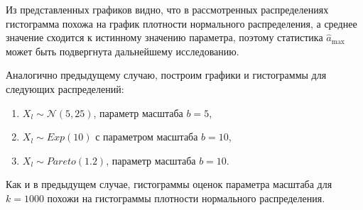 \documentclass[14pt, a4paper, russian]{report}
\begin{document}
Из представленных графиков видно, что в рассмотренных распределениях гистограмма похожа на график плотности нормального распределения, а среднее значение сходится к истинному значению параметра, поэтому статистика $\hat{a}_{\max}$ может быть подвергнута дальнейшему исследованию.



Аналогично предыдущему случаю, построим графики и гистограммы для следующих распределений:

\begin{enumerate}
  \item $X_l \sim \mathcal{N}(5, 25)$, параметр масштаба $b = 5$,
  \item $X_l \sim Exp(10)$ с параметром масштаба $b = 10$,
  \item $X_l \sim Pareto(1.2)$, параметр масштаба $b = 10$.
\end{enumerate}







Как и в предыдущем случае, гистограммы оценок параметра масштаба для $k = 1000$ похожи на гистограммы плотности нормального распределения.

\newpage

\end{document}
